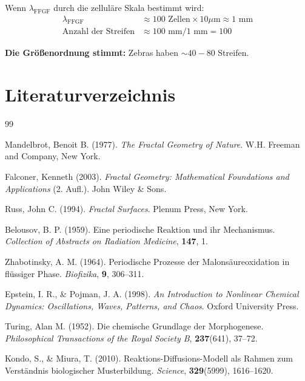 Wenn $\lambda_{\text{FFGF}}$ durch die zelluläre Skala bestimmt wird:
\begin{align*}
	\lambda_{\text{FFGF}} &\approx 100 \text{ Zellen} \times 10 \mu\text{m} \approx 1 \text{ mm} \\
	\text{Anzahl der Streifen} &\approx 100 \text{ mm} / 1 \text{ mm} = 100
\end{align*}

\textbf{Die Größenordnung stimmt:} Zebras haben $\sim 40-80$ Streifen.

\section*{Literaturverzeichnis}

\begin{thebibliography}{99}
	
	Mandelbrot, Benoit B. (1977). \textit{The Fractal Geometry of Nature}. 
	W.H. Freeman and Company, New York.
	
	Falconer, Kenneth (2003). \textit{Fractal Geometry: Mathematical Foundations and Applications} (2. Aufl.). 
	John Wiley \& Sons.
	
	Russ, John C. (1994). \textit{Fractal Surfaces}. 
	Plenum Press, New York.
	
	Belousov, B. P. (1959). Eine periodische Reaktion und ihr Mechanismus. 
	\textit{Collection of Abstracts on Radiation Medicine}, \textbf{147}, 1.
	
	Zhabotinsky, A. M. (1964). Periodische Prozesse der Malonsäureoxidation in flüssiger Phase. 
	\textit{Biofizika}, \textbf{9}, 306--311.
	
	Epstein, I. R., \& Pojman, J. A. (1998). \textit{An Introduction to Nonlinear Chemical Dynamics: Oscillations, Waves, Patterns, and Chaos}. 
	Oxford University Press.
	
	Turing, Alan M. (1952). Die chemische Grundlage der Morphogenese. 
	\textit{Philosophical Transactions of the Royal Society B}, \textbf{237}(641), 37--72.
	
	Kondo, S., \& Miura, T. (2010). Reaktions-Diffusions-Modell als Rahmen zum Verständnis biologischer Musterbildung. 
	\textit{Science}, \textbf{329}(5999), 1616--1620.
	

\end{thebibliography}
